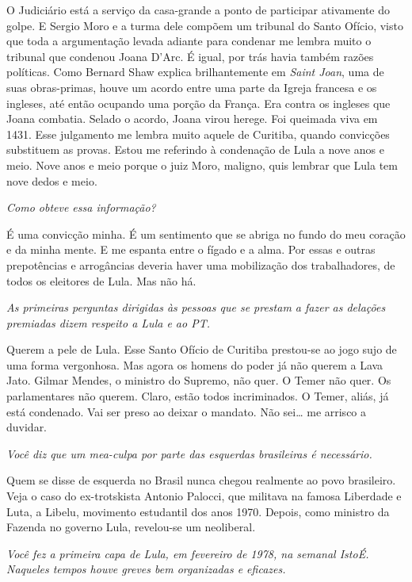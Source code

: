 \normalfont 
O Judiciário está a serviço da casa-grande a ponto de
participar ativamente do golpe. E Sergio Moro e a turma dele compõem um
tribunal do Santo Ofício, visto que toda a argumentação levada adiante
para condenar me lembra muito o tribunal que condenou Joana D'Arc. É
igual, por trás havia também razões políticas. Como Bernard Shaw explica
brilhantemente em \emph{Saint Joan}, uma de suas obras-primas, houve um
acordo entre uma parte da Igreja francesa e os ingleses, até então
ocupando uma porção da França. Era contra os ingleses que Joana
combatia. Selado o acordo, Joana virou herege. Foi queimada viva em
1431. Esse julgamento me lembra muito aquele de Curitiba, quando
convicções substituem as provas. Estou me referindo à condenação de Lula
a nove anos e meio. Nove anos e meio porque o juiz Moro, maligno, quis
lembrar que Lula tem nove dedos e meio.

\itshape
Como obteve essa informação?

\normalfont 
É uma convicção minha. É um sentimento que se abriga no
fundo do meu coração e da minha mente. E me espanta entre o fígado e a
alma. Por essas e outras prepotências e arrogâncias deveria haver uma
mobilização dos trabalhadores, de todos os eleitores de Lula. Mas não
há.

\itshape
As primeiras perguntas dirigidas às pessoas que se
prestam a fazer as delações premiadas dizem respeito a Lula e ao PT.

\normalfont 
Querem a pele de Lula. Esse Santo Ofício de Curitiba
prestou-se ao jogo sujo de uma forma vergonhosa. Mas agora os homens do
poder já não querem a Lava Jato. Gilmar Mendes, o ministro do Supremo,
não quer. O Temer não quer. Os parlamentares não querem. Claro, estão
todos incriminados. O Temer, aliás, já está condenado. Vai ser preso ao
deixar o mandato. Não sei\ldots{} me arrisco a duvidar.

\itshape
Você diz que um \emph{mea-culpa} por parte das
esquerdas brasileiras é necessário.

\normalfont 
Quem se disse de esquerda no Brasil nunca chegou
realmente ao povo brasileiro. Veja o caso do ex-trotskista Antonio
Palocci, que militava na famosa Liberdade e Luta, a Libelu, movimento
estudantil dos anos 1970. Depois, como ministro da Fazenda no governo
Lula, revelou-se um neoliberal.

\itshape
Você fez a primeira capa de Lula, em fevereiro de 1978,
na semanal \emph{IstoÉ}. Naqueles tempos houve greves bem organizadas e
eficazes.


